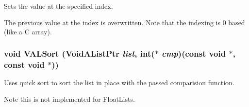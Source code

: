 Sets the value at the specified index. 

The previous value at the index is overwritten. Note that the indexing is 0 based (like a C array). 
\subsubsection{\setlength{\rightskip}{0pt plus 5cm}void VALSort (Void\-AList\-Ptr {\em list}, int($\ast$ {\em cmp})(const void $\ast$, const void $\ast$))}\label{lists_8h_a50}


Uses quick sort to sort the list in place with the passed comparision function. 

Note this is not implemented for Float\-Lists. 
